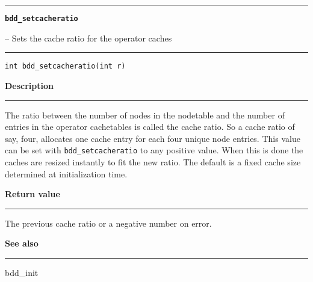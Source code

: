 \begin{minipage}{\textwidth}

\noindent\begin{minipage}{\textwidth}
\rule{\textwidth}{0.5mm}
{\tt\bf bdd\_setcacheratio }
\--- Sets the cache ratio for the operator caches  \hspace{\fill}
\\\rule[1.5ex]{\textwidth}{0.5mm}
\end{minipage}

\noindent\begin{verbatim}
int bdd_setcacheratio(int r) 
\end{verbatim}

\vspace{\parsep}\noindent
{\bf Description}\\\rule[1.5ex]{\textwidth}{0.2mm}\vspace{-1.5ex}\setlength{\parindent}{1em}
The ratio between the number of nodes in the nodetable
           and the number of entries in the operator cachetables is called
	   the cache ratio. So a cache ratio of say, four, allocates one cache
	   entry for each four unique node entries. This value can be set with
	   {\tt bdd\_setcacheratio} to any positive value. When this is done
	   the caches are resized instantly to fit the new ratio.
	   The default is a fixed cache size determined at
	   initialization time. 

\setlength{\parindent}{0em}\vspace{\parsep}\vspace{\baselineskip}\noindent
{\bf Return value}\\\rule[1.5ex]{\textwidth}{0.2mm}\vspace{-1.5ex}
The previous cache ratio or a negative number on error. 

\vspace{\parsep}\vspace{\baselineskip}\noindent
{\bf See also}\\\rule[1.5ex]{\textwidth}{0.2mm}\vspace{-1.5ex}
bdd\_init 
\end{minipage}
\vspace{8ex}
